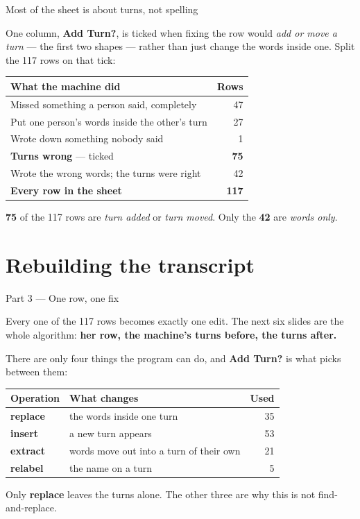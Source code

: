 \documentclass[aspectratio=169]{beamer}
\newcommand{\keybox}[1]{%
  \par\vspace{4pt}\begingroup\centering
  \colorbox{warmbg}{\parbox{0.93\textwidth}{\centering #1}}%
  \par\endgroup\vspace{2pt}}
\newenvironment{nicetable}[1]
  {\par\vspace{2pt}\begingroup\centering\small
   \renewcommand{\arraystretch}{1.18}%
   \setlength{\tabcolsep}{6pt}\rowcolors{2}{band}{white}%
   \begin{tabular}{#1}\arrayrulecolor{hdr}\toprule}
  {\bottomrule\end{tabular}\par\endgroup\vspace{2pt}}
\newcommand{\hd}[1]{\textcolor{hdr}{\textbf{#1}}}
\newcommand{\num}[1]{\textcolor{warm}{\textbf{#1}}}
\begin{document}
\begin{frame}{Most of the sheet is about turns, not spelling}

One column, \textbf{Add Turn?}, is ticked when fixing the row would \emph{add or move a
turn} --- the first two shapes --- rather than just change the words inside one. Split the
117 rows on that tick:

\begin{nicetable}{p{8.2cm}r}
\hd{What the machine did} & \hd{Rows} \\ \midrule
Missed something a person said, completely      & 47 \\
Put one person's words inside the other's turn  & 27 \\
Wrote down something nobody said                & 1 \\ \midrule
\rowcolor{warmbg} \textbf{Turns wrong} --- ticked & \num{75} \\
Wrote the wrong words; the turns were right     & 42 \\ \midrule
\rowcolor{band} \textbf{Every row in the sheet} & \textbf{117} \\
\end{nicetable}

\keybox{\num{75} of the 117 rows are \emph{turn added} or \emph{turn moved}. Only the
\num{42} are \emph{words only}.}

\end{frame}
\section{Rebuilding the transcript}
\begin{frame}{Part 3 --- One row, one fix}

Every one of the 117 rows becomes exactly one edit. The next six slides are the whole
algorithm: \textbf{her row, the machine's turns before, the turns after.}

\vspace{0.6em}
There are only four things the program can do, and \textbf{Add Turn?} is what picks between
them:

\begin{nicetable}{p{2.3cm}p{7.0cm}r}
\hd{Operation} & \hd{What changes} & \hd{Used} \\ \midrule
\textbf{replace} & the words inside one turn & 35 \\
\textbf{insert}  & a new turn appears & 53 \\
\textbf{extract} & words move out into a turn of their own & 21 \\
\textbf{relabel} & the name on a turn & 5 \\
\end{nicetable}

\keybox{Only \textbf{replace} leaves the turns alone. The other three are why this is not
find-and-replace.}

\end{frame}
\end{document}
